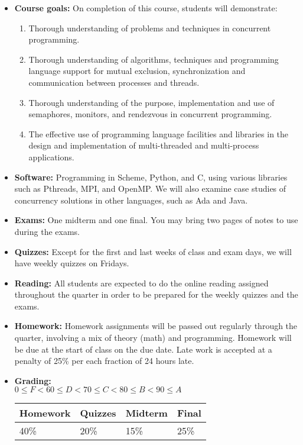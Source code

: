 \documentclass{article}
\begin{document}
\begin{itemize}
\begin{itemize}
\end{itemize}
\item
{\bf Course goals:}
On completion of this course, students will demonstrate: 
  \begin{enumerate}
  \item Thorough understanding of problems and techniques in
    concurrent programming.
\item Thorough understanding of algorithms, techniques and programming
  language support for mutual exclusion, synchronization and
  communication between processes and threads.
\item Thorough understanding of the purpose, implementation and use of
  semaphores, monitors, and rendezvous in concurrent programming.
\item The effective use of programming language facilities and
  libraries in the design and implementation of multi-threaded and
  multi-process applications.

  \end{enumerate}
\item {\bf Software:} Programming in Scheme, Python, and C, using
  various libraries such as Pthreads, MPI, and OpenMP.  We will also
  examine case studies of concurrency solutions in other languages,
  such as Ada and Java.

\item {\bf Exams:}   One
  midterm and one final.  You may bring two pages of notes to use
  during the exams.

\item {\bf Quizzes:} Except for the first and last weeks of class and
  exam days, we will have weekly quizzes on Fridays.

\item {\bf Reading:} All students are expected to do the online
  reading assigned throughout the quarter in order to be prepared for
  the weekly quizzes and the exams.

\item {\bf Homework:}  Homework assignments will be passed out
  regularly through the quarter, involving a mix of theory (math) and
  programming.   Homework will be due at the start of
  class on the due date.  Late work is accepted at a penalty
  of 25\% per each fraction of 24 hours late.

\item {\bf Grading:} \\
$0\leq F < 60 \leq D < 70 \leq C < 80 \leq B < 90 \leq A$\hfill
\begin{tabular}{|l|l|l|l|}\hline
Homework & Quizzes & Midterm & Final\\\hline
40\% & 20\% & 15\% & 25\%\\\hline
\end{tabular}


\end{itemize}
\end{document}
